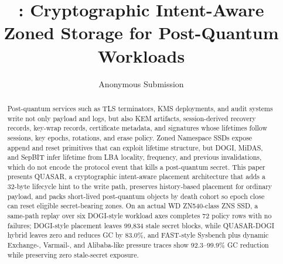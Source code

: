 \documentclass[letterpaper,twocolumn,10pt]{article}
\date{}
\title{\Large \bf \system: Cryptographic Intent-Aware Zoned Storage for Post-Quantum Workloads}
\author{Anonymous Submission}
\newcommand{\system}{QUASAR\xspace}
\newcommand{\dogi}{DOGI\xspace}
\newcommand{\midas}{MiDAS\xspace}
\newcommand{\sepbit}{SepBIT\xspace}
\newcommand{\zns}{ZNS\xspace}
\begin{document}
\maketitle

\begin{abstract}
Post-quantum services such as TLS terminators, KMS deployments, and audit systems write not only payload and logs, but also KEM artifacts, session-derived recovery records, key-wrap records, certificate metadata, and signatures whose lifetimes follow sessions, key epochs, rotations, and erase policy.
Zoned Namespace SSDs expose append and reset primitives that can exploit lifetime structure, but \dogi, \midas, and \sepbit infer lifetime from LBA locality, frequency, and previous invalidations, which do not encode the protocol event that kills a post-quantum secret.
This paper presents \system, a cryptographic intent-aware placement architecture that adds a 32-byte lifecycle hint to the write path, preserves history-based placement for ordinary payload, and packs short-lived post-quantum objects by death cohort so epoch close can reset eligible secret-bearing zones.
On an actual WD ZN540-class \zns SSD, a same-path replay over six DOGI-style workload axes completes 72 policy rows with no failures; \dogi-style placement leaves 99,834 stale secret blocks, while \system-\dogi hybrid leaves zero and reduces GC by 83.0\%, and FAST-style Sysbench plus dynamic Exchange-, Varmail-, and Alibaba-like pressure traces show 92.3--99.9\% GC reduction while preserving zero stale-secret exposure.
\end{abstract}







\clearpage






\end{document}
